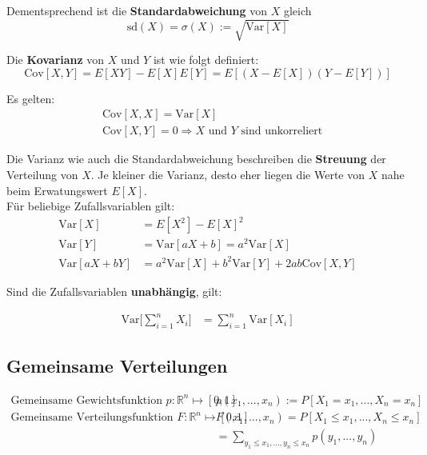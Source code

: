 \documentclass[11pt]{article}
\newcommand{\Var}{\text{Var}}
\newcommand{\Cov}{\text{Cov}}
\begin{document}
Dementsprechend ist die \textbf{Standardabweichung} von $X$ gleich
\begin{equation*}
	\text{sd}(X) = \sigma(X) := \sqrt{\Var[X]}
\end{equation*}

Die \textbf{Kovarianz} von $X$ und $Y$ ist wie folgt definiert:
\begin{equation*}
	\Cov[X,Y] = E[XY] - E[X]E[Y] = E[(X - E[X])(Y-E[Y])]
\end{equation*}

Es gelten:
\begin{equation*}
\begin{split}
	& \Cov[X, X] = \Var[X] \\
	& \Cov[X, Y] = 0 \Rightarrow \text{$X$ und $Y$ sind unkorreliert}
\end{split}
\end{equation*}

Die Varianz wie auch die Standardabweichung beschreiben die \textbf{Streuung} der Verteilung von $X$. Je kleiner die Varianz, desto eher liegen die Werte von $X$ nahe beim Erwatungswert $E[X]$. \\

F{\"u}r beliebige Zufallsvariablen gilt:
\begin{equation*}
\begin{split}
	\Var[X] & = E[X^2] - E[X]^2 \\
	\Var[Y] & = \Var[aX +b] = a^2\Var[X] \\
	\Var[aX + bY] & = a^2\Var[X] + b^2\Var[Y] + 2ab\Cov[X,Y]
\end{split}	
\end{equation*}

Sind die Zufallsvariablen \textbf{unabh{\"a}ngig}, gilt:

\begin{equation*}
\begin{split}
	\Var\Bigg[\sum_{i=1}^n X_i \Bigg]  & = \sum_{i=1}^n\Var[X_i]
\end{split}
\end{equation*}

\subsection{Gemeinsame Verteilungen}

\begin{equation*}
\begin{split}
	\text{Gemeinsame Gewichtsfunktion } p: \mathbb{R}^n \mapsto [0,1] \qquad & p(x_1,...,x_n) := P[X_1 = x_1,..., X_n = x_n] \\
	\text{Gemeinsame Verteilungsfunktion } F: \mathbb{R}^n \mapsto [0,1] \qquad & F(x_1,...,x_n) = P[X_1 \leq x_1,..., X_n \leq x_n] \\
	& = \sum_{y_1 \leq x_1,...,y_n \leq x_n} p(y_1,...,y_n)
\end{split}
\end{equation*}
\end{document}
